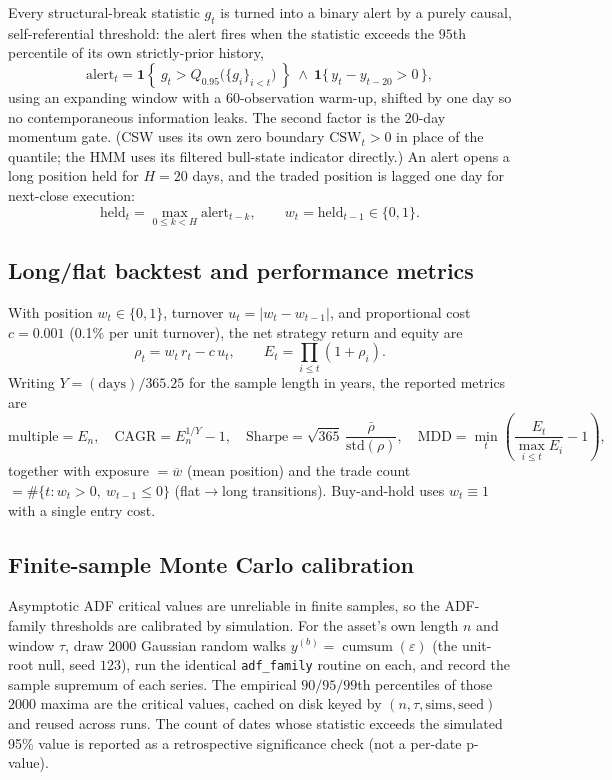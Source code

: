 \documentclass[11pt]{article}
\begin{document}
Every structural-break statistic $g_t$ is turned into a binary alert by a purely causal, self-referential threshold: the alert fires when the statistic exceeds the $95$th percentile of its own strictly-prior history,
\[
    \mathrm{alert}_t = \mathbf{1}\!\left\{\ g_t > Q_{0.95}\big(\{g_i\}_{i<t}\big)\ \right\}\ \wedge\ \mathbf{1}\{\,y_t-y_{t-20}>0\,\},
\]
using an expanding window with a $60$-observation warm-up, shifted by one day so no contemporaneous information leaks. The second factor is the $20$-day momentum gate. (CSW uses its own zero boundary $\mathrm{CSW}_t>0$ in place of the quantile; the HMM uses its filtered bull-state indicator directly.) An alert opens a long position held for $H=20$ days, and the traded position is lagged one day for next-close execution:
\[
    \mathrm{held}_t = \max_{0\le k<H} \mathrm{alert}_{t-k},
    \qquad
    w_t = \mathrm{held}_{t-1}\in\{0,1\}.
\]

\subsection{Long/flat backtest and performance metrics}

With position $w_t\in\{0,1\}$, turnover $u_t=\lvert w_t-w_{t-1}\rvert$, and proportional cost $c=0.001$ (0.1\% per unit turnover), the net strategy return and equity are
\[
    \rho_t = w_t\, r_t - c\,u_t,
    \qquad
    E_t = \prod_{i\le t}(1+\rho_i).
\]
Writing $Y=(\text{days})/365.25$ for the sample length in years, the reported metrics are
\[
    \text{multiple}=E_n,\quad
    \mathrm{CAGR}=E_n^{1/Y}-1,\quad
    \mathrm{Sharpe}=\sqrt{365}\,\frac{\bar\rho}{\mathrm{std}(\rho)},\quad
    \mathrm{MDD}=\min_t\!\left(\frac{E_t}{\max_{i\le t}E_i}-1\right),
\]
together with exposure $=\overline{w}$ (mean position) and the trade count $=\#\{t: w_t>0,\ w_{t-1}\le 0\}$ (flat$\to$long transitions). Buy-and-hold uses $w_t\equiv1$ with a single entry cost.

\subsection{Finite-sample Monte Carlo calibration}

Asymptotic ADF critical values are unreliable in finite samples, so the ADF-family thresholds are calibrated by simulation. For the asset's own length $n$ and window $\tau$, draw $2000$ Gaussian random walks $y^{(b)}=\operatorname{cumsum}(\varepsilon)$ (the unit-root null, seed $123$), run the identical \texttt{adf\_family} routine on each, and record the sample supremum of each series. The empirical $90/95/99$th percentiles of those $2000$ maxima are the critical values, cached on disk keyed by $(n,\tau,\text{sims},\text{seed})$ and reused across runs. The count of dates whose statistic exceeds the simulated 95\% value is reported as a retrospective significance check (not a per-date p-value).
\end{document}
